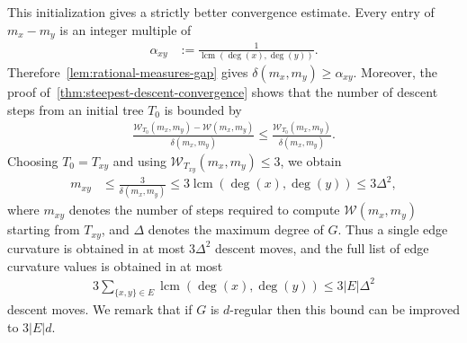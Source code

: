 \documentclass[11pt,a4paper]{article}
\newcommand{\wass}{{\mathcal{W}}}
\begin{document}
    This initialization gives a strictly better convergence estimate. Every entry of $m_x-m_y$ is an integer multiple of
        \begin{align*}
            \alpha_{xy} &:= \frac{1}{\operatorname{lcm}(\deg(x),\deg(y))}.
        \end{align*}
    Therefore~\cref{lem:rational-measures-gap} gives $\delta(m_x,m_y)\ge \alpha_{xy}$. Moreover, the proof of~\cref{thm:steepest-descent-convergence} shows that the number of descent steps from an initial tree $T_0$ is bounded by
        \begin{align*}
            \frac{\wass_{T_0}(m_x,m_y)-\wass(m_x,m_y)}{\delta(m_x,m_y)}
            \le \frac{\wass_{T_0}(m_x,m_y)}{\delta(m_x,m_y)}.
        \end{align*}
    Choosing $T_0=T_{xy}$ and using $\wass_{T_{xy}}(m_x,m_y)\le 3$, we obtain
        \begin{align*}
            m_{xy} &\le \frac{3}{\delta(m_x,m_y)}
            \le 3\operatorname{lcm}(\deg(x),\deg(y))
            \le 3\Delta^2,
        \end{align*}
    where $m_{xy}$ denotes the number of steps required to compute $\wass(m_x,m_y)$ starting from $T_{xy}$, and $\Delta$ denotes the maximum degree of $G$. Thus a single edge curvature is obtained in at most $3\Delta^2$ descent moves, and the full list of edge curvature values is obtained in at most
        \begin{align*}
            3\sum_{\{x,y\}\in E}\operatorname{lcm}(\deg(x),\deg(y))
            \le 3|E|\Delta^2
        \end{align*}
    descent moves. We remark that if $G$ is $d$-regular then this bound can be improved to $3|E|d$. 
\end{document}
